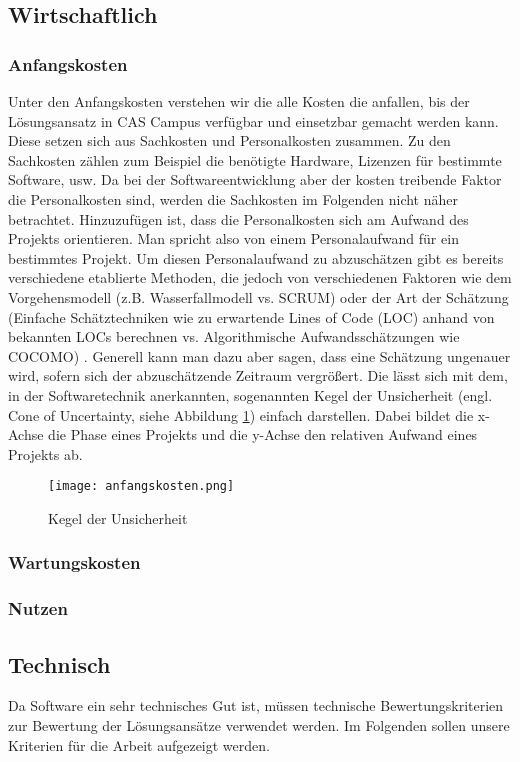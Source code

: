 \subsection{Wirtschaftlich}
\subsubsection{Anfangskosten}
Unter den Anfangskosten verstehen wir die alle Kosten die anfallen, bis der Lösungsansatz in CAS Campus verfügbar und einsetzbar gemacht werden kann. Diese setzen sich aus Sachkosten und Personalkosten zusammen. Zu den Sachkosten zählen zum Beispiel die benötigte Hardware, Lizenzen für bestimmte Software, usw. Da bei der Softwareentwicklung aber der kosten treibende Faktor die Personalkosten sind, werden die Sachkosten im Folgenden nicht näher betrachtet. Hinzuzufügen ist, dass die Personalkosten sich am Aufwand des Projekts orientieren. Man spricht also von einem Personalaufwand für ein bestimmtes Projekt. Um diesen Personalaufwand zu abzuschätzen gibt es bereits verschiedene etablierte Methoden, die jedoch von verschiedenen Faktoren wie dem Vorgehensmodell (z.B. Wasserfallmodell vs. SCRUM) \cite{vorgehensmodelle} oder der Art der Schätzung (Einfache Schätztechniken wie zu erwartende Lines of Code (LOC) anhand von bekannten LOCs berechnen vs. Algorithmische Aufwandsschätzungen wie COCOMO) \cite{aufwand}. Generell kann man dazu aber sagen, dass eine Schätzung ungenauer wird, sofern sich der abzuschätzende Zeitraum vergrößert. Die lässt sich mit dem, in der Softwaretechnik anerkannten, sogenannten  Kegel der Unsicherheit (engl.  Cone of Uncertainty, siehe Abbildung \ref{img2:costs}) einfach darstellen. Dabei bildet die x-Achse die Phase eines Projekts und die y-Achse den relativen Aufwand eines Projekts ab.
\begin{figure}[ht]
\begin{center}
\texttt{[image: anfangskosten.png]}
\caption{Kegel der Unsicherheit }
\label{img2:costs}
\end{center}
\end{figure} 
\subsubsection{Wartungskosten}
\subsubsection{Nutzen}

\subsection{Technisch}
Da Software ein sehr technisches Gut ist, müssen technische Bewertungskriterien zur Bewertung der Lösungsansätze verwendet werden. Im Folgenden sollen unsere Kriterien für die Arbeit aufgezeigt werden.

